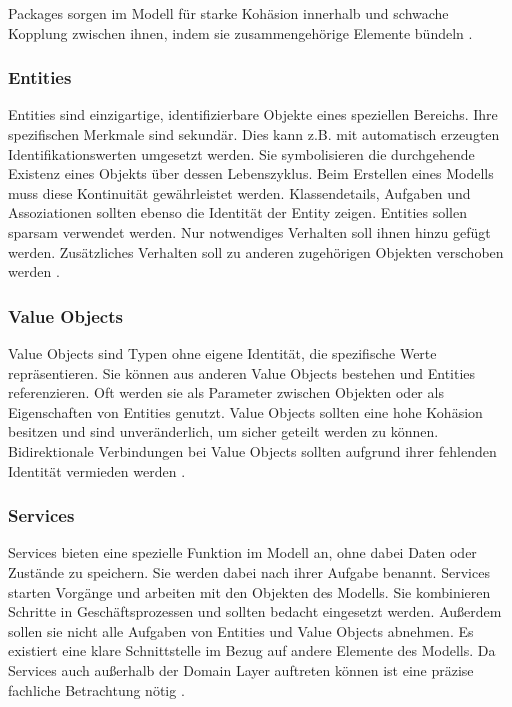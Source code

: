 {\glqq Packages\grqq{} sorgen im Modell für starke Kohäsion innerhalb und schwache Kopplung zwischen ihnen, indem sie zusammengehörige Elemente bündeln \cite[S. 109 - 116]{evans}.

\subsubsection{Entities}

\glqq Entities\grqq{} sind einzigartige, identifizierbare Objekte eines speziellen Bereichs. Ihre spezifischen Merkmale sind sekundär. Dies kann z.B. mit automatisch erzeugten Identifikationswerten umgesetzt werden. Sie symbolisieren die durchgehende Existenz eines Objekts über dessen Lebenszyklus. Beim Erstellen eines Modells muss diese Kontinuität gewährleistet werden. Klassendetails, Aufgaben und Assoziationen sollten ebenso die Identität der Entity zeigen. Entities sollen sparsam verwendet werden. Nur notwendiges Verhalten soll ihnen hinzu gefügt werden. Zusätzliches Verhalten soll zu anderen zugehörigen Objekten verschoben werden \cite[S. 89-96]{evans} \cite[S.75]{daschner}.

\subsubsection{Value Objects}

\glqq Value Objects\grqq{} sind Typen ohne eigene Identität, die spezifische Werte repräsentieren. Sie können aus anderen Value Objects bestehen und Entities referenzieren. Oft werden sie als Parameter zwischen Objekten oder als Eigenschaften von Entities genutzt. Value Objects sollten eine hohe Kohäsion besitzen und sind unveränderlich, um sicher geteilt werden zu können. Bidirektionale Verbindungen bei Value Objects sollten aufgrund ihrer fehlenden Identität vermieden werden \cite[S. 97-103]{evans} \cite[S.75]{daschner}.

\subsubsection{Services}

\glqq Services\grqq{} bieten eine spezielle Funktion im Modell an, ohne dabei Daten oder Zustände zu speichern. Sie werden dabei nach ihrer Aufgabe benannt. Services starten Vorgänge und arbeiten mit den Objekten des Modells. Sie kombinieren Schritte in Geschäftsprozessen und sollten bedacht eingesetzt werden. Außerdem sollen sie nicht alle Aufgaben von Entities und Value Objects abnehmen. Es existiert eine klare Schnittstelle im Bezug auf andere Elemente des Modells. Da Services auch außerhalb der Domain Layer auftreten können ist eine präzise fachliche Betrachtung nötig \cite[S. 104 - 108]{evans} \cite[S.74]{daschner}.

}
